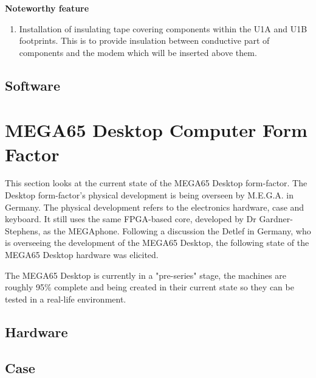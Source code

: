 \textbf{Noteworthy feature}
\begin{enumerate}
\item Installation of insulating tape covering components within the U1A and U1B footprints. This is to provide insulation between conductive part of components and the modem which will be inserted above them. \\
\end{enumerate}


\subsection{Software}



\section{MEGA65 Desktop Computer Form Factor}
This section looks at the current state of the MEGA65 Desktop form-factor. The Desktop form-factor's physical development is being overseen by M.E.G.A. in Germany. The physical development refers to the electronics hardware, case and keyboard. It still uses the same FPGA-based core, developed by Dr Gardner-Stephens, as the MEGAphone. Following a discussion the Detlef in Germany, who is overseeing the development of the MEGA65 Desktop, the following state of the MEGA65 Desktop hardware was elicited. 

The MEGA65 Desktop is currently in a "pre-series" stage, the machines are roughly 95\% complete and being created in their current state so they can be tested in a real-life environment. 

\subsection{Hardware}


\subsection{Case}
